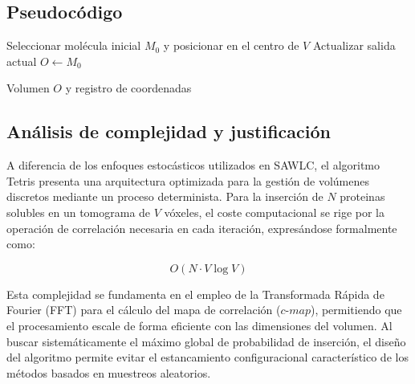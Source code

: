 \subsection{Pseudocódigo}

\begin{algorithm}[H]
    \caption{Generación de volúmenes congestionados mediante Tetris}
    \label{alg:tetris_tecnico}
    Seleccionar molécula inicial $M_0$ y posicionar en el centro de $V$\;
    Actualizar salida actual $O \gets M_0$\;
    
    \Return Volumen $O$ y registro de coordenadas\;
\end{algorithm}

\subsection{Análisis de complejidad y justificación}

A diferencia de los enfoques estocásticos utilizados en SAWLC, el algoritmo Tetris presenta una arquitectura optimizada para la gestión de volúmenes discretos mediante un proceso determinista. Para la inserción de $N$ proteinas solubles en un tomograma de $V$ vóxeles, el coste computacional se rige por la operación de correlación necesaria en cada iteración, expresándose formalmente como:

\begin{equation}
O(N \cdot V \log V)
\end{equation}

Esta complejidad se fundamenta en el empleo de la Transformada Rápida de Fourier (FFT) para el cálculo del mapa de correlación ($c\text{-}map$), permitiendo que el procesamiento escale de forma eficiente con las dimensiones del volumen. Al buscar sistemáticamente el máximo global de probabilidad de inserción, el diseño del algoritmo permite evitar el estancamiento configuracional característico de los métodos basados en muestreos aleatorios.\\

